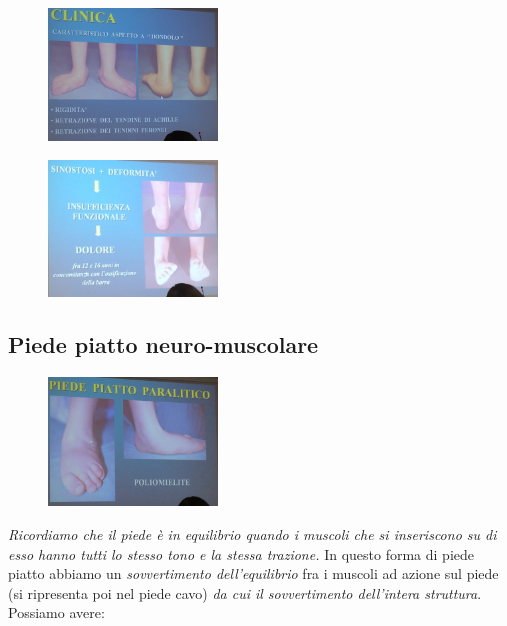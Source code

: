 \begin{figure}[!ht]
\centering
\includegraphics[width=0.4\textwidth]{014/image10.jpeg}
\end{figure}

\begin{figure}[!ht]
\centering
\includegraphics[width=0.4\textwidth]{014/image11.jpeg}
\end{figure}

\subsection{Piede piatto neuro-muscolare}

\begin{figure}[!ht]
\centering
\includegraphics[width=0.4\textwidth]{014/image12.jpeg}
\end{figure}

\emph{Ricordiamo che il piede è in equilibrio quando i muscoli che si inseriscono su di esso hanno tutti lo stesso tono e la stessa trazione.} In questo forma
di piede piatto abbiamo un \emph{sovvertimento dell'equilibrio} fra i muscoli ad azione sul piede (si ripresenta poi nel piede cavo) \emph{da cui il sovvertimento dell'intera struttura}. Possiamo avere:


